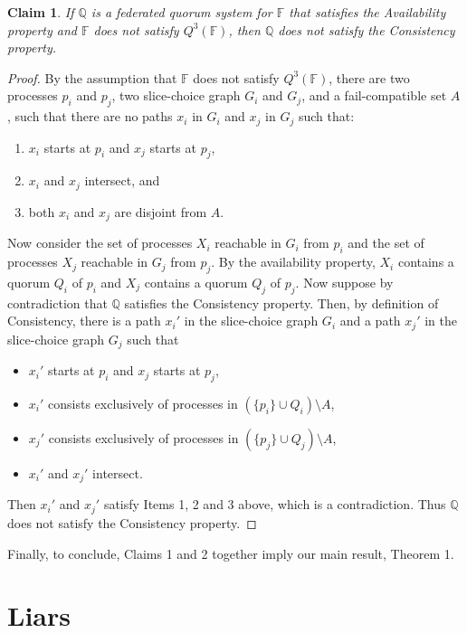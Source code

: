 \documentclass[11pt]{article}
\newtheorem{claim}{Claim}
\begin{document}
\begin{claim}
  \label{thm:Q3_must_hold}
  If $\mathbb{Q}$ is a federated quorum system for $\mathbb{F}$ that satisfies the Availability property and $\mathbb{F}$ does not satisfy $Q^3(\mathbb{F})$, then $\mathbb{Q}$ does not satisfy the Consistency property.
\end{claim}
\begin{proof}
  By the assumption that $\mathbb{F}$ does not satisfy $Q^3(\mathbb{F})$, there are two processes $p_i$ and $p_j$, two slice-choice graph $G_i$ and $G_j$, and a fail-compatible set $A$, such that there are no paths $x_i$ in $G_i$ and $x_j$ in $G_j$ such that:
  \begin{enumerate}
    \item $x_i$ starts at $p_i$ and $x_j$ starts at $p_j$,
    \item $x_i$ and $x_j$ intersect, and
    \item both $x_i$ and $x_j$ are disjoint from $A$.
  \end{enumerate}
  Now consider the set of processes $X_i$ reachable in $G_i$ from $p_i$ and the set of processes $X_j$ reachable in $G_j$ from $p_j$. By the availability property, $X_i$ contains a quorum $Q_i$ of $p_i$ and $X_j$ contains a quorum $Q_j$ of $p_j$.
  Now suppose by contradiction that $\mathbb{Q}$ satisfies the Consistency property.
  Then, by definition of Consistency, there is a path $x_i'$ in the slice-choice graph $G_i$ and a path $x_j'$ in the slice-choice graph $G_j$ such that
  \begin{itemize}
    \item $x_i'$ starts at $p_i$ and $x_j$ starts at $p_j$,
    \item $x_i'$ consists exclusively of processes in $\left(\{p_i\} \cup Q_i\right)\setminus A$,
    \item $x_j'$ consists exclusively of processes in $\left(\{p_j\} \cup Q_j\right)\setminus A$,
    \item $x_i'$ and $x_j'$ intersect.
  \end{itemize}
  Then $x_i'$ and $x_j'$ satisfy Items 1, 2 and 3 above, which is a contradiction. Thus $\mathbb{Q}$ does not satisfy the Consistency property.
\end{proof}

Finally, to conclude, Claims 1 and 2 together imply our main result, Theorem 1.

\section{Liars}
\label{sec:lying}
\end{document}
